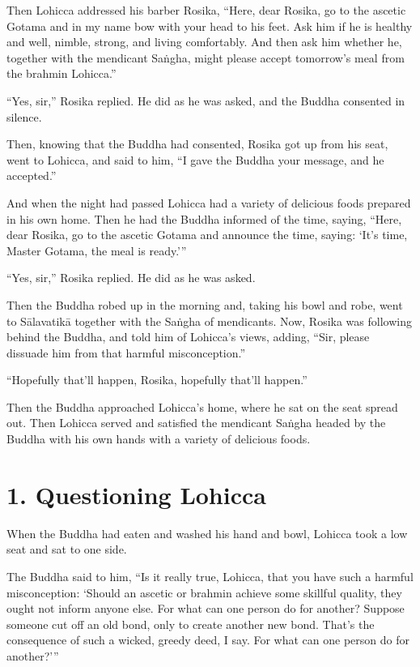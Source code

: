 \documentclass[12pt,openany]{book}%
\begin{document}
Then Lohicca addressed his barber Rosika, “Here, dear Rosika, go to the ascetic Gotama and in my name bow with your head to his feet. Ask him if he is healthy and well, nimble, strong, and living comfortably. And then ask him whether he, together with the mendicant \textsanskrit{Saṅgha}, might please accept tomorrow’s meal from the brahmin Lohicca.” 

“Yes, sir,” Rosika replied. He did as he was asked, and the Buddha consented in silence. 

Then, knowing that the Buddha had consented, Rosika got up from his seat, went to Lohicca, and said to him, “I gave the Buddha your message, and he accepted.” 

And when the night had passed Lohicca had a variety of delicious foods prepared in his own home. Then he had the Buddha informed of the time, saying, “Here, dear Rosika, go to the ascetic Gotama and announce the time, saying: ‘It’s time, Master Gotama, the meal is ready.’” 

“Yes, sir,” Rosika replied. He did as he was asked. 

Then the Buddha robed up in the morning and, taking his bowl and robe, went to \textsanskrit{Sālavatikā} together with the \textsanskrit{Saṅgha} of mendicants. Now, Rosika was following behind the Buddha, and told him of Lohicca’s views, adding, “Sir, please dissuade him from that harmful misconception.” 

“Hopefully that’ll happen, Rosika, hopefully that’ll happen.” 

Then the Buddha approached Lohicca’s home, where he sat on the seat spread out. Then Lohicca served and satisfied the mendicant \textsanskrit{Saṅgha} headed by the Buddha with his own hands with a variety of delicious foods. 

\section*{1. Questioning Lohicca }

When the Buddha had eaten and washed his hand and bowl, Lohicca took a low seat and sat to one side. 

The Buddha said to him, “Is it really true, Lohicca, that you have such a harmful misconception: ‘Should an ascetic or brahmin achieve some skillful quality, they ought not inform anyone else. For what can one person do for another? Suppose someone cut off an old bond, only to create another new bond. That’s the consequence of such a wicked, greedy deed, I say. For what can one person do for another?’” 
\end{document}
